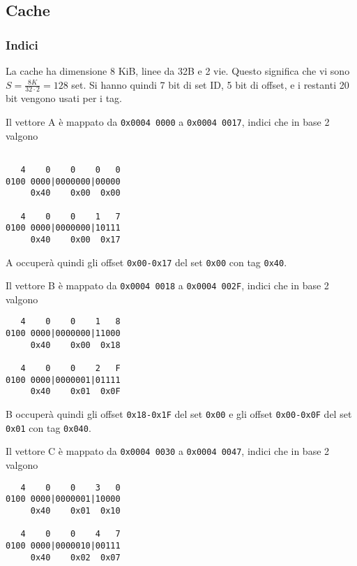 \documentclass[a4paper]{article}
\begin{document}
\begin{verbatim}
\end{verbatim}

\subsection{Cache}
\subsubsection{Indici}
La cache ha dimensione 8 KiB, linee da 32B e 2 vie.
Questo significa che vi sono $S = \frac{8K}{32 \cdot 2} = 128$ set.
Si hanno quindi 7 bit di set ID, 5 bit di offset, e i restanti 20 bit vengono usati per i tag.

Il vettore A è mappato da \texttt{0x0004 0000} a \texttt{0x0004 0017}, indici che in base 2 valgono 

\begin{verbatim}

   4    0    0    0   0
0100 0000|0000000|00000
     0x40    0x00  0x00

   4    0    0    1   7
0100 0000|0000000|10111
     0x40    0x00  0x17

\end{verbatim}

A occuperà quindi gli offset \texttt{0x00-0x17} del set \texttt{0x00} con tag \texttt{0x40}.

Il vettore B è mappato da \texttt{0x0004 0018} a \texttt{0x0004 002F}, indici che in base 2 valgono 

\begin{verbatim}
   4    0    0    1   8
0100 0000|0000000|11000
     0x40    0x00  0x18

   4    0    0    2   F
0100 0000|0000001|01111
     0x40    0x01  0x0F
\end{verbatim}

B occuperà quindi gli offset \texttt{0x18-0x1F} del set \texttt{0x00} e gli offset \texttt{0x00-0x0F} del set \texttt{0x01} con tag \texttt{0x040}.

Il vettore C è mappato da \texttt{0x0004 0030} a \texttt{0x0004 0047}, indici che in base 2 valgono 

\begin{verbatim}
   4    0    0    3   0
0100 0000|0000001|10000
     0x40    0x01  0x10

   4    0    0    4   7
0100 0000|0000010|00111
     0x40    0x02  0x07
\end{verbatim}
\end{document}
